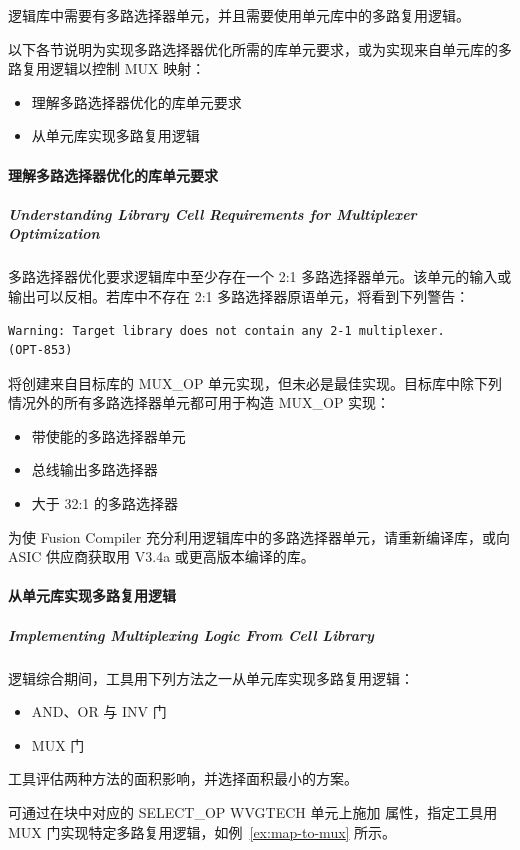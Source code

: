 逻辑库中需要有多路选择器单元，并且需要使用单元库中的多路复用逻辑。

以下各节说明为实现多路选择器优化所需的库单元要求，或为实现来自单元库的多路复用逻辑以控制 MUX 映射：
\begin{itemize}
  \item 理解多路选择器优化的库单元要求
  \item 从单元库实现多路复用逻辑
\end{itemize}

\paragraph{理解多路选择器优化的库单元要求}
\subparagraph*{Understanding Library Cell Requirements for Multiplexer Optimization}

多路选择器优化要求逻辑库中至少存在一个 2:1 多路选择器单元。该单元的输入或输出可以反相。若库中不存在 2:1 多路选择器原语单元，将看到下列警告：
\begin{lstlisting}
Warning: Target library does not contain any 2-1 multiplexer.
(OPT-853)
\end{lstlisting}

将创建来自目标库的 MUX\_OP 单元实现，但未必是最佳实现。目标库中除下列情况外的所有多路选择器单元都可用于构造 MUX\_OP 实现：
\begin{itemize}
  \item 带使能的多路选择器单元
  \item 总线输出多路选择器
  \item 大于 32:1 的多路选择器
\end{itemize}

为使 Fusion Compiler 充分利用逻辑库中的多路选择器单元，请重新编译库，或向 ASIC 供应商获取用 V3.4a 或更高版本编译的库。

\paragraph{从单元库实现多路复用逻辑}
\subparagraph*{Implementing Multiplexing Logic From Cell Library}

逻辑综合期间，工具用下列方法之一从单元库实现多路复用逻辑：
\begin{itemize}
  \item AND、OR 与 INV 门
  \item MUX 门
\end{itemize}

工具评估两种方法的面积影响，并选择面积最小的方案。

可通过在块中对应的 SELECT\_OP WVGTECH 单元上施加  属性，指定工具用 MUX 门实现特定多路复用逻辑，如例~\ref{ex:map-to-mux} 所示。

